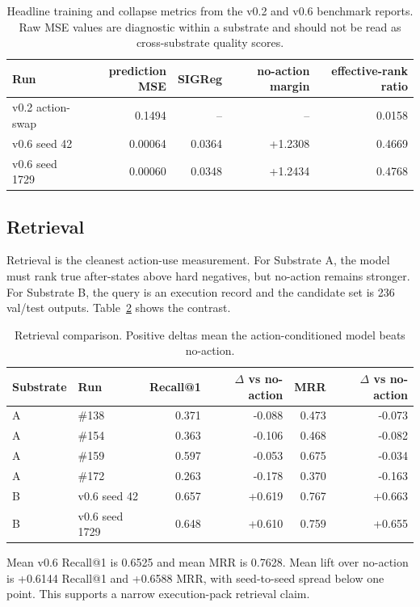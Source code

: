 \documentclass[11pt]{article}
\newcommand{\subA}{Substrate A}
\newcommand{\subB}{Substrate B}
\begin{document}
\begin{table}[t]
\centering
\caption{Headline training and collapse metrics from the v0.2 and v0.6
benchmark reports. Raw MSE values are diagnostic within a substrate and should
not be read as cross-substrate quality scores.}
\label{tab:training}
\begin{tabular}{lrrrr}
\toprule
Run & prediction MSE & SIGReg & no-action margin & effective-rank ratio \\
\midrule
v0.2 action-swap & 0.1494 & -- & -- & 0.0158 \\
v0.6 seed 42 & 0.00064 & 0.0364 & +1.2308 & 0.4669 \\
v0.6 seed 1729 & 0.00060 & 0.0348 & +1.2434 & 0.4768 \\
\bottomrule
\end{tabular}
\end{table}

\subsection{Retrieval}

Retrieval is the cleanest action-use measurement. For \subA{}, the model must
rank true after-states above hard negatives, but no-action remains stronger.
For \subB{}, the query is an execution record and the candidate set is 236
val/test outputs. Table~\ref{tab:retrieval} shows the contrast.

\begin{table}[t]
\centering
\caption{Retrieval comparison. Positive deltas mean the action-conditioned
model beats no-action.}
\label{tab:retrieval}
\begin{tabular}{llrrrr}
\toprule
Substrate & Run & Recall@1 & $\Delta$ vs no-action & MRR & $\Delta$ vs no-action \\
\midrule
A & \#138 & 0.371 & -0.088 & 0.473 & -0.073 \\
A & \#154 & 0.363 & -0.106 & 0.468 & -0.082 \\
A & \#159 & 0.597 & -0.053 & 0.675 & -0.034 \\
A & \#172 & 0.263 & -0.178 & 0.370 & -0.163 \\
B & v0.6 seed 42 & 0.657 & +0.619 & 0.767 & +0.663 \\
B & v0.6 seed 1729 & 0.648 & +0.610 & 0.759 & +0.655 \\
\bottomrule
\end{tabular}
\end{table}

Mean v0.6 Recall@1 is 0.6525 and mean MRR is 0.7628. Mean lift over
no-action is +0.6144 Recall@1 and +0.6588 MRR, with seed-to-seed spread below
one point. This supports a narrow execution-pack retrieval claim.
\end{document}
